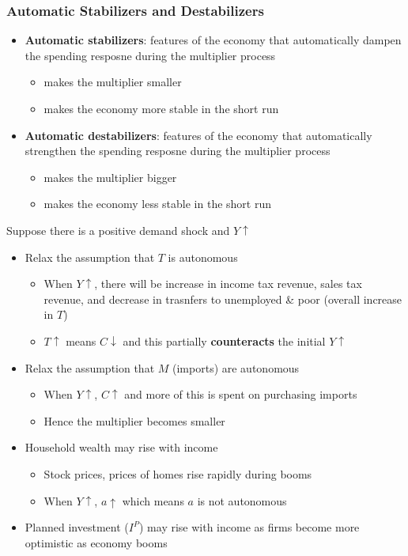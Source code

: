 \documentclass{article}
\begin{document}
\begin{multicols}{2}
\subsubsection{Automatic Stabilizers and Destabilizers}
\begin{itemize}
	\item \textbf{Automatic stabilizers}: features of the economy that automatically dampen the spending resposne during the multiplier process
	\begin{itemize}
		\item makes the multiplier smaller
		\item makes the economy more stable in the short run
	\end{itemize}
	\item \textbf{Automatic destabilizers}: features of the economy that automatically strengthen the spending resposne during the multiplier process
	\begin{itemize}
		\item makes the multiplier bigger
		\item makes the economy less stable in the short run
	\end{itemize}
\end{itemize}
Suppose there is a positive demand shock and $Y \uparrow$
\begin{itemize}
	\item Relax the assumption that $T$ is autonomous
	\begin{itemize}
		\item When $Y \uparrow$, there will be increase in income tax revenue, sales tax revenue, and decrease in trasnfers to unemployed \& poor (overall increase in $T$)
		\item $T \uparrow$ means $C\downarrow$ and this partially \textbf{counteracts} the initial $Y\uparrow$
	\end{itemize}
	\item Relax the assumption that $M$ (imports) are autonomous
	\begin{itemize}
		\item When $Y \uparrow$, $C \uparrow$ and more of this is spent on purchasing imports
		\item Hence the multiplier becomes smaller
	\end{itemize}
    \item Household wealth may rise with income
    \begin{itemize}
    	\item Stock prices, prices of homes rise rapidly during booms
    	\item When $Y\uparrow$, $a \uparrow$ which means $a$ is not autonomous
    \end{itemize}
    \item Planned investment ($I^P$) may rise with income as firms become more optimistic as economy booms
\end{itemize}

\end{multicols}
\end{document}
